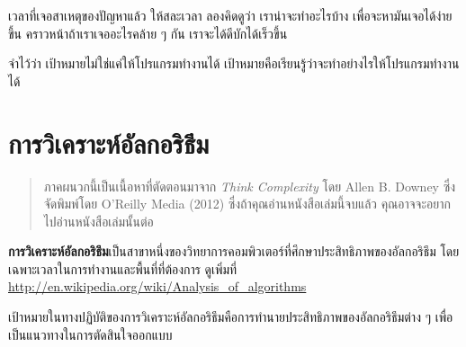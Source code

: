 
เวลาที่เจอสาเหตุของปัญหาแล้ว
ให้สละเวลา ลองคิดดูว่า เราน่าจะทำอะไรบ้าง
เพื่อจะหามันเจอได้ง่ายขึ้น
คราวหน้าถ้าเราเจออะไรคล้าย ๆ กัน
เราจะได้ดีบักได้เร็วขึ้น


จำไว้ว่า
เป้าหมายไม่ใช่แค่ให้โปรแกรมทำงานได้
เป้าหมายคือเรียนรู้ว่าจะทำอย่างไรให้โปรแกรมทำงานได้

\chapter{การวิเคราะห์อัลกอริธึม} %
\label{algorithms}

\begin{quote}

ภาคผนวกนี้เป็นเนื้อหาที่ตัดตอนมาจาก {\it Think Complexity} โดย Allen B. Downey 
ซึ่งจัดพิมพ์โดย O'Reilly Media (2012) 
ซึ่งถ้าคุณอ่านหนังสือเล่มนี้จบแล้ว คุณอาจจะอยากไปอ่านหนังสือเล่มนั้นต่อ
\end{quote}


{\bf การวิเคราะห์อัลกอริธึม}เป็นสาขาหนึ่งของวิทยาการคอมพิวเตอร์ที่ศึกษาประสิทธิภาพของอัลกอริธึม 
โดยเฉพาะเวลาในการทำงานและพื้นที่ที่ต้องการ ดูเพิ่มที่ \url{http://en.wikipedia.org/wiki/Analysis_of_algorithms}
 


เป้าหมายในทางปฏิบัติของการวิเคราะห์อัลกอริธึมคือการทำนายประสิทธิภาพของอัลกอริธึมต่าง ๆ เพื่อเป็นแนวทางในการตัดสินใจออกแบบ


